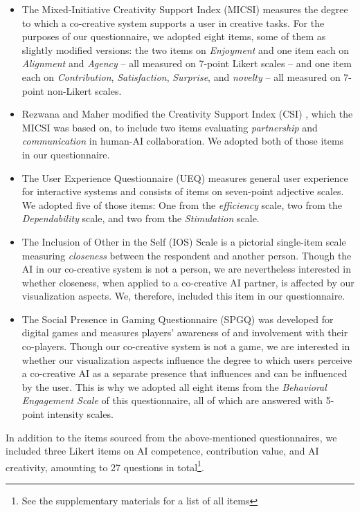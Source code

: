 \begin{itemize}
	\item The Mixed-Initiative Creativity Support Index (MICSI) \cite{lawton_drawing_2023} measures the degree to which a co-creative system supports a user in creative tasks. For the purposes of our questionnaire, we adopted eight items, some of them as slightly modified versions: the two items on \textit{Enjoyment} and one item each on \textit{Alignment} and \textit{Agency} – all measured on 7-point Likert scales – and one item each on \textit{Contribution}, \textit{Satisfaction}, \textit{Surprise}, and \textit{novelty} – all measured on 7-point non-Likert scales.
	\item Rezwana and Maher \cite{rezwana_understanding_2022} modified the Creativity Support Index (CSI) \cite{cherry_quantifying_2014}, which the MICSI was based on, to include two items evaluating \textit{partnership} and \emph{communication} in human-AI collaboration. We adopted both of those items in our questionnaire.
	\item The User Experience Questionnaire (UEQ) \cite{laugwitz_construction_2008} measures general user experience for interactive systems and consists of items on seven-point adjective scales. We adopted five of those items: One from the \textit{efficiency} scale, two from the \textit{Dependability} scale, and two from the \textit{Stimulation} scale.
	\item The Inclusion of Other in the Self (IOS) Scale \cite{aron_inclusion_1992} is a pictorial single-item scale measuring \textit{closeness} between the respondent and another person. Though the AI in our co-creative system is not a person, we are nevertheless interested in whether closeness, when applied to a co-creative AI partner, is affected by our visualization aspects. We, therefore, included this item in our questionnaire.
	\item The Social Presence in Gaming Questionnaire (SPGQ) \cite{de_kort_digital_2007} was developed for digital games and measures players' awareness of and involvement with their co-players. Though our co-creative system is not a game, we are interested in whether our visualization aspects influence the degree to which users perceive a co-creative AI as a separate presence that influences and can be influenced by the user. This is why we adopted all eight items from the \textit{Behavioral Engagement Scale} of this questionnaire, all of which are answered with 5-point intensity scales.
\end{itemize}
In addition to the items sourced from the above-mentioned questionnaires, we included three Likert items on AI competence, contribution value, and AI creativity, amounting to 27 questions in total\footnote{See the supplementary materials for a list of all items}.
 
